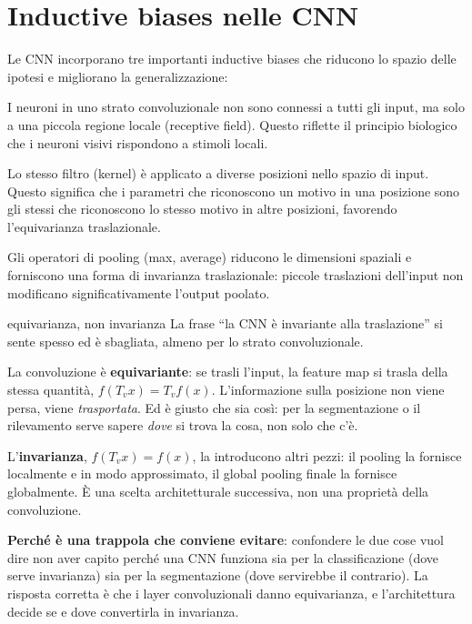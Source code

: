 \section{Inductive biases nelle CNN}

Le CNN incorporano tre importanti inductive biases che riducono lo spazio delle ipotesi e migliorano la generalizzazione:

\begin{definition}
I neuroni in uno strato convoluzionale non sono connessi a tutti gli input, ma solo a una piccola regione locale (receptive field). Questo riflette il principio biologico che i neuroni visivi rispondono a stimoli locali.
\end{definition}

\begin{definition}
Lo stesso filtro (kernel) è applicato a diverse posizioni nello spazio di input. Questo significa che i parametri che riconoscono un motivo in una posizione sono gli stessi che riconoscono lo stesso motivo in altre posizioni, favorendo l'equivarianza traslazionale.
\end{definition}

\begin{definition}
Gli operatori di pooling (max, average) riducono le dimensioni spaziali e forniscono una forma di invarianza traslazionale: piccole traslazioni dell'input non modificano significativamente l'output poolato.
\end{definition}

\begin{trappola}{equivarianza, non invarianza}
La frase ``la CNN è invariante alla traslazione'' si sente spesso ed è sbagliata, almeno per lo strato convoluzionale.

La convoluzione è \textbf{equivariante}: se trasli l'input, la feature map si trasla della stessa quantità, $f(T_v x) = T_v f(x)$. L'informazione sulla posizione non viene persa, viene \emph{trasportata}. Ed è giusto che sia così: per la segmentazione o il rilevamento serve sapere \emph{dove} si trova la cosa, non solo che c'è.

L'\textbf{invarianza}, $f(T_v x) = f(x)$, la introducono altri pezzi: il pooling la fornisce localmente e in modo approssimato, il global pooling finale la fornisce globalmente. È una scelta architetturale successiva, non una proprietà della convoluzione.

\textbf{Perché è una trappola che conviene evitare}: confondere le due cose vuol dire non aver capito perché una CNN funziona sia per la classificazione (dove serve invarianza) sia per la segmentazione (dove servirebbe il contrario). La risposta corretta è che i layer convoluzionali danno equivarianza, e l'architettura decide se e dove convertirla in invarianza.
\end{trappola}

